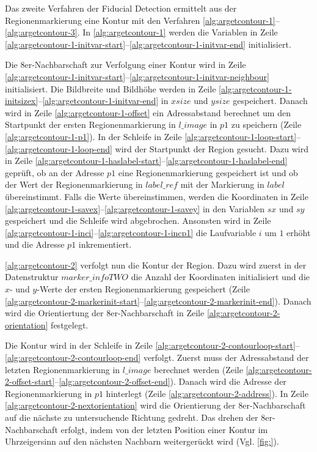 Das zweite Verfahren der Fiducial Detection ermittelt aus der Regionenmarkierung eine Kontur mit den Verfahren
 \autoref{alg:argetcontour-1}--\autoref{alg:argetcontour-3}. In \autoref{alg:argetcontour-1} werden die Variablen in
 Zeile \ref{alg:argetcontour-1-initvar-start}--\ref{alg:argetcontour-1-initvar-end} initialisiert.



Die 8er-Nachbarschaft zur Verfolgung einer Kontur wird in Zeile
 \ref{alg:argetcontour-1-initvar-start}--\ref{alg:argetcontour-1-initvar-neighbour} initialisiert. Die Bildbreite und
 Bildhöhe werden in Zeile \ref{alg:argetcontour-1-initsizex}--\ref{alg:argetcontour-1-initvar-end} in $\mathit{xsize}$
 und $\mathit{ysize}$ gespeichert. Danach wird in Zeile \ref{alg:argetcontour-1-offset} ein Adressabstand berechnet um
 den Startpunkt der ersten Regionenmarkierung in $\mathit{l\_image}$ in $\mathit{p1}$ zu speichern (Zeile
 \ref{alg:argetcontour-1-p1}). In der Schleife in Zeile
 \ref{alg:argetcontour-1-loop-start}--\ref{alg:argetcontour-1-loop-end} wird der Startpunkt der Region gesucht. Dazu
 wird in Zeile \ref{alg:argetcontour-1-haslabel-start}--\ref{alg:argetcontour-1-haslabel-end} geprüft, ob an der
 Adresse $\mathit{p1}$ eine Regionenmarkierung gespeichert ist und ob der Wert der Regionenmarkierung in
 $\mathit{label\_ref}$ mit der Markierung in $\mathit{label}$ übereinstimmt. Falls die Werte übereinstimmen, werden die
 Koordinaten in Zeile \ref{alg:argetcontour-1-savex}--\ref{alg:argetcontour-1-savey} in den Variablen $\mathit{sx}$ und
 $\mathit{sy}$ gespeichert und die Schleife wird abgebrochen. Ansonsten wird in Zeile
 \ref{alg:argetcontour-1-inci}--\ref{alg:argetcontour-1-incp1} die Laufvariable $i$ um $1$ erhöht und die Adresse
 $\mathit{p1}$ inkrementiert.

\autoref{alg:argetcontour-2} verfolgt nun die Kontur der Region. Dazu wird zuerst in der Datenstruktur
 $\mathit{marker\_infoTWO}$ die Anzahl der Koordinaten initialisiert und die $x$- und $y$-Werte der ersten
 Regionenmarkierung gespeichert (Zeile
 \ref{alg:argetcontour-2-markerinit-start}--\ref{alg:argetcontour-2-markerinit-end}). Danach wird die Orientiertung der
 8er-Nachbarschaft in Zeile \ref{alg:argetcontour-2-orientation} festgelegt.



Die Kontur wird in der Schleife in Zeile
 \ref{alg:argetcontour-2-contourloop-start}--\ref{alg:argetcontour-2-contourloop-end} verfolgt. Zuerst muss der
 Adressabstand der letzten Regionenmarkierung in $\mathit{l\_image}$ berechnet werden (Zeile
 \ref{alg:argetcontour-2-offset-start}--\ref{alg:argetcontour-2-offset-end}). Danach wird die Adresse der
 Regionenmarkierung in $\mathit{p1}$ hinterlegt (Zeile \ref{alg:argetcontour-2-address}). In Zeile
 \ref{alg:argetcontour-2-nextorientation} wird die Orientierung der 8er-Nachbarschaft auf die nächste zu untersuchende
 Richtung gedreht. Das drehen der 8er-Nachbarschaft erfolgt, indem von der letzten Position einer Kontur im
 Uhrzeigersinn auf den nächsten Nachbarn weitergerückt wird (Vgl. \autoref{fig:}).

